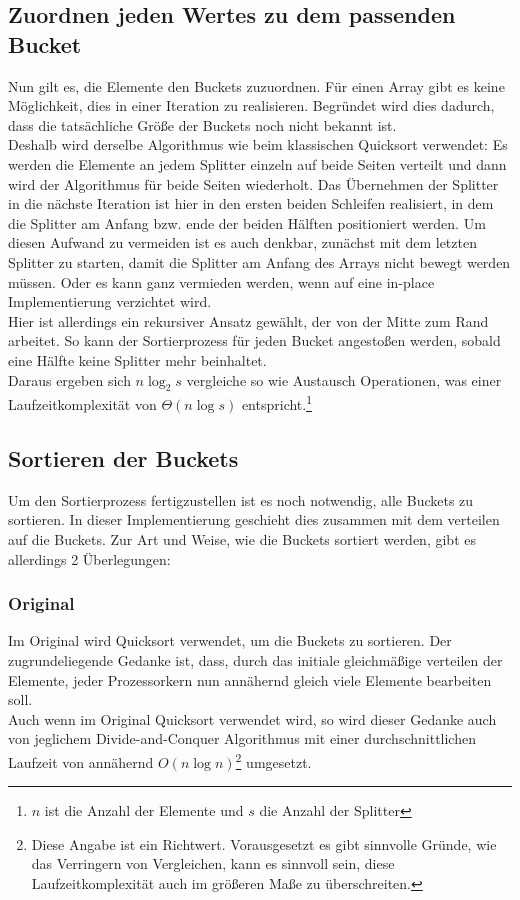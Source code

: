 	\subsection{Zuordnen jeden Wertes zu dem passenden Bucket}
		
		Nun gilt es, die Elemente den Buckets zuzuordnen.
		Für einen Array gibt es keine Möglichkeit, dies in einer Iteration zu realisieren.
		Begründet wird dies dadurch, dass die tatsächliche Größe der Buckets noch nicht bekannt ist.\\
		Deshalb wird derselbe Algorithmus wie beim klassischen Quicksort verwendet:
		Es werden die Elemente an jedem Splitter einzeln auf beide Seiten verteilt und dann wird der Algorithmus für beide Seiten wiederholt.
		Das Übernehmen der Splitter in die nächste Iteration ist hier in den ersten beiden Schleifen realisiert, in dem die Splitter am Anfang bzw. ende der beiden Hälften positioniert werden.
		Um diesen Aufwand zu vermeiden ist es auch denkbar, zunächst mit dem letzten Splitter zu starten, damit die Splitter am Anfang des Arrays nicht bewegt werden müssen.
		Oder es kann ganz vermieden werden, wenn auf eine in-place Implementierung verzichtet wird.\\
		Hier ist allerdings ein rekursiver Ansatz gewählt, der von der Mitte zum Rand arbeitet.
		So kann der Sortierprozess für jeden Bucket angestoßen werden, sobald eine Hälfte keine Splitter mehr beinhaltet.\\
		Daraus ergeben sich $n\log_2s$ vergleiche so wie Austausch Operationen, was einer Laufzeitkomplexität von $\Theta(n\log{s})$ entspricht.\footnote{$n$ ist die Anzahl der Elemente und $s$ die Anzahl der Splitter}

	\subsection{Sortieren der Buckets}
		Um den Sortierprozess fertigzustellen ist es noch notwendig, alle Buckets zu sortieren.
		In dieser Implementierung geschieht dies zusammen mit dem verteilen auf die Buckets.
		Zur Art und Weise, wie die Buckets sortiert werden, gibt es allerdings 2 Überlegungen:
		\subsubsection{Original}
			Im Original \autocite{frazer-1970} wird Quicksort verwendet, um die Buckets zu sortieren.
			Der zugrundeliegende Gedanke ist, dass, durch das initiale gleichmäßige verteilen der Elemente, jeder Prozessorkern nun annähernd gleich viele Elemente bearbeiten soll.\\
			Auch wenn im Original Quicksort verwendet wird, so wird dieser Gedanke auch von jeglichem Divide-and-Conquer Algorithmus mit einer durchschnittlichen Laufzeit von annähernd $O(n\log{n})$\footnote{Diese Angabe ist ein Richtwert. Vorausgesetzt es gibt sinnvolle Gründe, wie das Verringern von Vergleichen, kann es sinnvoll sein, diese Laufzeitkomplexität auch im größeren Maße zu überschreiten.} umgesetzt. 

